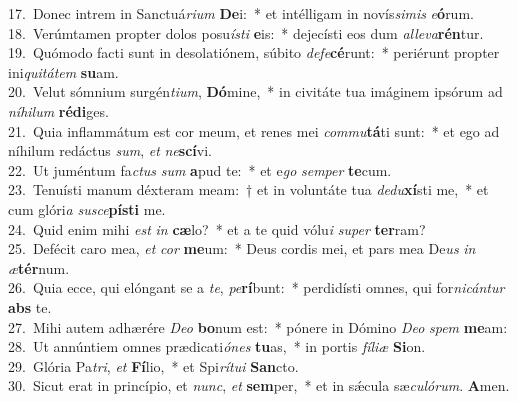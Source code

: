{17.~}Donec intrem in Sanctuá\textit{ri}\textit{um} \textbf{De}i:~* et intélligam in novís\textit{si}\textit{mis} \textit{e}\textbf{ó}rum.\\
{18.~}Verúmtamen propter dolos posu\textit{í}\textit{sti} \textbf{e}is:~* dejecísti eos dum \textit{al}\textit{le}\textit{va}\textbf{rén}tur.\\
{19.~}Quómodo facti sunt in desolatiónem, súbito \textit{de}\textit{fe}\textbf{cé}runt:~* periérunt propter ini\textit{qui}\textit{tá}\textit{tem} \textbf{su}am.\\
{20.~}Velut sómnium surgén\textit{ti}\textit{um}, \textbf{Dó}mine,~* in civitáte tua imáginem ipsórum ad \textit{ní}\textit{hi}\textit{lum} \textbf{ré}\textbf{di}ges.\\
{21.~}Quia inflammátum est cor meum, et renes mei \textit{com}\textit{mu}\textbf{tá}ti sunt:~* et ego ad níhilum redáctus \textit{sum}, \textit{et} \textit{ne}\textbf{scí}vi.\\
{22.~}Ut juméntum fa\textit{ctus} \textit{sum} \textbf{a}pud te:~* et e\textit{go} \textit{sem}\textit{per} \textbf{te}cum.\\
{23.~}Tenuísti manum déxteram meam:~† et in voluntáte tua \textit{de}\textit{du}\textbf{xí}sti me,~* et cum glóri\textit{a} \textit{su}\textit{sce}\textbf{pí}\textbf{sti} me.\\
{24.~}Quid enim mihi \textit{est} \textit{in} \textbf{cæ}lo?~* et a te quid vólu\textit{i} \textit{su}\textit{per} \textbf{ter}ram?\\
{25.~}Defécit caro mea, \textit{et} \textit{cor} \textbf{me}um:~* Deus cordis mei, et pars mea De\textit{us} \textit{in} \textit{æ}\textbf{tér}num.\\
{26.~}Quia ecce, qui elóngant se a \textit{te}, \textit{pe}\textbf{rí}bunt:~* perdidísti omnes, qui for\textit{ni}\textit{cán}\textit{tur} \textbf{abs} te.\\
{27.~}Mihi autem adhærére \textit{De}\textit{o} \textbf{bo}num est:~* pónere in Dómino \textit{De}\textit{o} \textit{spem} \textbf{me}am:\\
{28.~}Ut annúntiem omnes prædicati\textit{ó}\textit{nes} \textbf{tu}as,~* in portis \textit{fí}\textit{li}\textit{æ} \textbf{Si}on.\\
{29.~}Glória Pa\textit{tri}, \textit{et} \textbf{Fí}lio,~* et Spi\textit{rí}\textit{tu}\textit{i} \textbf{San}cto.\\
{30.~}Sicut erat in princípio, et \textit{nunc}, \textit{et} \textbf{sem}per,~* et in sǽcula sæ\textit{cu}\textit{ló}\textit{rum}. \textbf{A}men.\\
